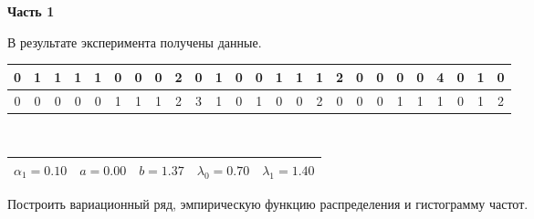 
\renewcommand*{\proofname}{Решение}
\textbf{Часть 1}

В результате эксперимента получены данные. \\

\begin{tabular}{|c|c|c|c|c|c|c|c|c|c|c|c|c|c|c|c|c|c|c|c|c|c|c|c|c|}
	\hline
	0&1&1&1&1&0&0&0&2&0&1&0&0&1&1&1&2&0&0&0&0&4&0&1&0\\ \hline 0&0&0&0&0&1&1&1&2&3&1&0&1&0&0&2&0&0&0&1&1&1&0&1&2\\
	\hline 
\end{tabular}
\\

\begin{tabular}{|c|c|c|c|c|}
	\hline
	$\alpha_1=0.10$ & $a = 0.00$ & $b = 1.37$ & $\lambda_0=0.70$ & $\lambda_1=1.40$ \\
	\hline
\end{tabular}


\begin{problem}
	Построить вариационный ряд, эмпирическую функцию распределения и гистограмму частот.
\end{problem}

